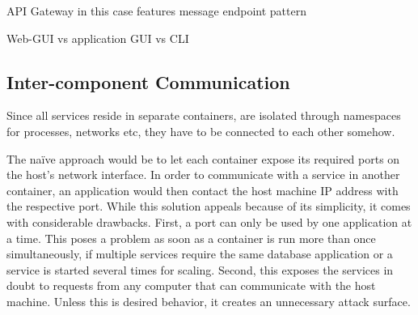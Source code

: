   API Gateway in this case features message endpoint pattern \cite[pp.~95-97]{Hohpe2004Enterprise}


  Web-GUI vs application GUI vs CLI

\subsection{Inter-component Communication} %
\label{sub:inter_component_communication}

  Since all services reside in separate containers, \ie are isolated through namespaces for processes, networks etc, they have to be connected to each other somehow.

  The naïve approach would be to let each container expose its required ports on the host's network interface. In order to communicate with a service in another container, an application would then contact the host machine \ac{IP} address with the respective port. While this solution appeals because of its simplicity, it comes with considerable drawbacks.
  First, a port can only be used by one application at a time. This poses a problem as soon as a container is run more than once simultaneously, \eg if multiple services require the same database application or a service is started several times for scaling.
  Second, this exposes the services in doubt to requests from any computer that can communicate with the host machine. Unless this is desired behavior, it creates an unnecessary attack surface.

